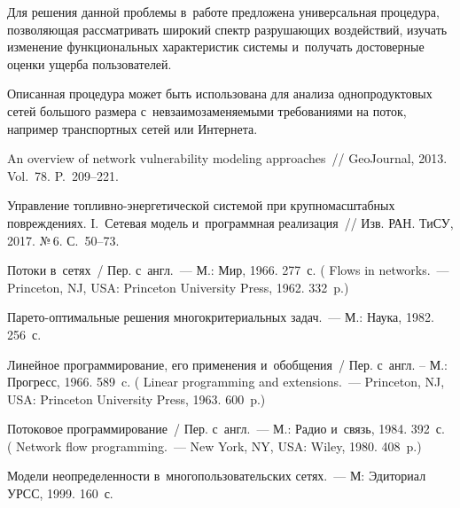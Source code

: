 \begin{multicols}{2}
Для решения данной проблемы в~работе пред\-ложена универсальная процедура, 
позволяющая рассматри\-вать широкий спектр разрушающих воздействий, изучать изменение 
функциональных характеристик сис\-те\-мы и~получать достоверные оценки ущерба 
пользователей. 

Описанная процедура может быть использована для анализа 
однопродуктовых сетей большого размера с~невзаимозаменяемыми требованиями 
на поток, например транспортных сетей или Интернета.

{\small\frenchspacing
 {%
 \begin{thebibliography}{9}

 An overview of network vulnerability modeling approaches~// 
GeoJournal, 2013. Vol.~78. P.~209--221.

 Управление  
топ\-лив\-но-энер\-ге\-ти\-че\-ской  системой  при  крупномасштабных повреждениях. 
I.~Сетевая  модель  и~программная реализация~// Изв. РАН. ТиСУ, 2017. №\,6. С.~50--73.

 Потоки в~сетях~/ Пер. с~англ.~--- 
М.: Мир, 1966. 277~с. ( Flows in networks.~--- 
Princeton, NJ, USA: Princeton University Press, 1962. 332~p.)

 Па\-ре\-то-оп\-ти\-маль\-ные 
решения многокритериальных задач.~--- М.: Наука, 1982. 256~с.

 Линейное программирование, его применения и~обобщения~/ 
Пер. с~англ. -- М.: Прогресс, 1966. 589~c. (  
Linear programming and extensions.~--- Princeton, NJ, USA: Princeton University Press, 1963. 
600~p.)



 Потоковое программирование~/ Пер. с~англ.~--- 
М.: Радио и~связь, 1984. 392~с. ( 
Network flow programming.~--- New York, NY, USA: Wiley, 1980. 408~p.)

Модели неопределенности в~многопользовательских сетях.~--- 
М: Эдиториал УРСС, 1999. 160~с.
 \end{thebibliography}

 }
 }

\end{multicols}

